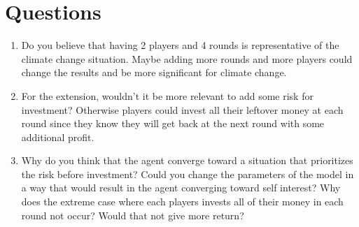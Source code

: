 \documentclass[letterpaper]{article}
\begin{document}
\section{Questions}
\begin{enumerate}
    \item Do you believe that having 2 players and 4 rounds is representative of the climate change situation. Maybe adding more rounds and more players could change the results and be more significant for climate change.
    \item For the extension, wouldn't it be more relevant to add some risk for investment? Otherwise players could invest all their leftover money at each round since they know they will get back at the next round with some additional profit.
    \item Why do you think that the agent converge toward a situation that prioritizes the risk before investment? Could you change the parameters of the model in a way that would result in the agent converging toward self interest?  Why does the extreme case where each players invests all of their money in each round not occur? Would that not give more return?
\end{enumerate}
\end{document}
